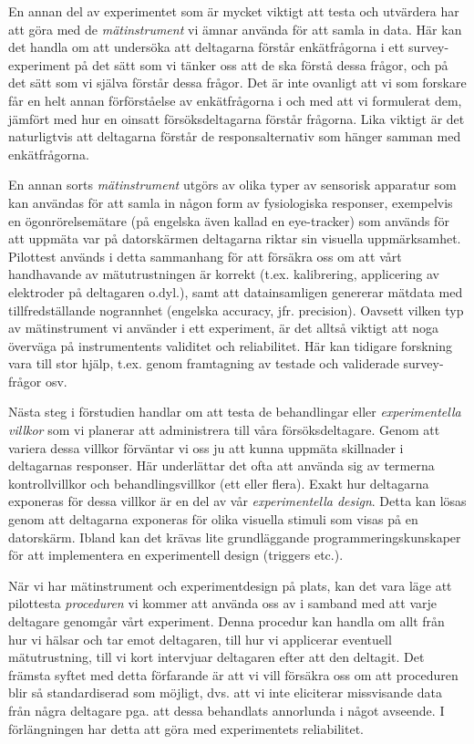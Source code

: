 \documentclass[
]{book}
\begin{document}
En annan del av experimentet som är mycket viktigt att testa och utvärdera har att göra med de \emph{mätinstrument} vi ämnar använda för att samla in data. Här kan det handla om att undersöka att deltagarna förstår enkätfrågorna i ett survey-experiment på det sätt som vi tänker oss att de ska förstå dessa frågor, och på det sätt som vi själva förstår dessa frågor. Det är inte ovanligt att vi som forskare får en helt annan förförståelse av enkätfrågorna i och med att vi formulerat dem, jämfört med hur en oinsatt försöksdeltagarna förstår frågorna. Lika viktigt är det naturligtvis att deltagarna förstår de responsalternativ som hänger samman med enkätfrågorna.

En annan sorts \emph{mätinstrument} utgörs av olika typer av sensorisk apparatur som kan användas för att samla in någon form av fysiologiska responser, exempelvis en ögonrörelsemätare (på engelska även kallad en eye-tracker) som används för att uppmäta var på datorskärmen deltagarna riktar sin visuella uppmärksamhet. Pilottest används i detta sammanhang för att försäkra oss om att vårt handhavande av mätutrustningen är korrekt (t.ex. kalibrering, applicering av elektroder på deltagaren o.dyl.), samt att datainsamligen genererar mätdata med tillfredställande nogrannhet (engelska accuracy, jfr. precision). Oavsett vilken typ av mätinstrument vi använder i ett experiment, är det alltså viktigt att noga överväga på instrumentents validitet och reliabilitet. Här kan tidigare forskning vara till stor hjälp, t.ex. genom framtagning av testade och validerade survey-frågor osv.

Nästa steg i förstudien handlar om att testa de behandlingar eller \emph{experimentella villkor} som vi planerar att administrera till våra försöksdeltagare. Genom att variera dessa villkor förväntar vi oss ju att kunna uppmäta skillnader i deltagarnas responser. Här underlättar det ofta att använda sig av termerna kontrollvillkor och behandlingsvillkor (ett eller flera). Exakt hur deltagarna exponeras för dessa villkor är en del av vår \emph{experimentella design}. Detta kan lösas genom att deltagarna exponeras för olika visuella stimuli som visas på en datorskärm. Ibland kan det krävas lite grundläggande programmeringskunskaper för att implementera en experimentell design (triggers etc.).

När vi har mätinstrument och experimentdesign på plats, kan det vara läge att pilottesta \emph{proceduren} vi kommer att använda oss av i samband med att varje deltagare genomgår vårt experiment. Denna procedur kan handla om allt från hur vi hälsar och tar emot deltagaren, till hur vi applicerar eventuell mätutrustning, till vi kort intervjuar deltagaren efter att den deltagit. Det främsta syftet med detta förfarande är att vi vill försäkra oss om att proceduren blir så standardiserad som möjligt, dvs. att vi inte eliciterar missvisande data från några deltagare pga. att dessa behandlats annorlunda i något avseende. I förlängningen har detta att göra med experimentets reliabilitet.
\end{document}
